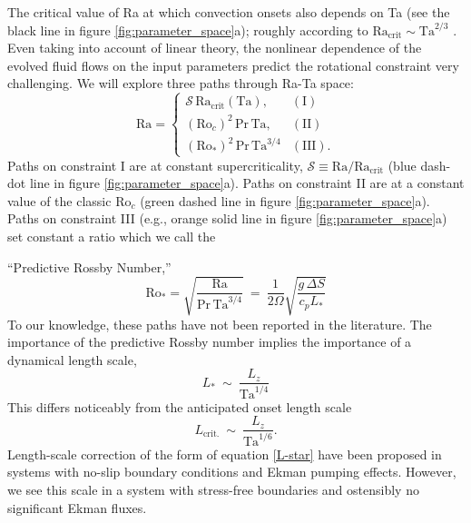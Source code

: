 \documentclass[twocolumn, amsmath, amsfonts, amssymb]{aastex62}
\newcommand{\pro}{\ensuremath{\text{Ro}_{\text{*}}}}
\newcommand{\con}{\ensuremath{\text{Ro}_{c}}}
\newcommand{\gv}[1]{{\color{blue} #1}}
\begin{document}
The critical value of Ra at which convection onsets also depends on Ta (see the black line in figure \ref{fig:parameter_space}a);  
\gv{roughly according to $\text{Ra}_{\text{crit}} \sim \text{Ta}^{2/3}$ \cite{Chandrasekhar}.}
\gv{Even taking into account of linear theory, the nonlinear dependence of the evolved fluid flows on the input parameters predict the rotational constraint very challenging. }
We will explore three paths through Ra-Ta space:
\begin{equation}
    \text{Ra} = 
    \begin{cases}
    \mathcal{S}\,\text{Ra}_\text{crit}(\text{Ta}), & (\text{I})\\
    (\con)^2 \, \text{Pr}\, \text{Ta}, & (\text{II}) \\
    (\pro)^2\, \text{Pr}\, \text{Ta}^{3/4} & (\text{III}).
    \end{cases}
    \label{eqn:paths}
\end{equation}
Paths on constraint I are at constant supercriticality, 
$\mathcal{S} \equiv \text{Ra}/\text{Ra}_{\text{crit}}$
(blue dash-dot line in figure \ref{fig:parameter_space}a).
Paths on constraint II are at a constant value of the classic $\con$ (green dashed line in figure \ref{fig:parameter_space}a). Paths on constraint
III (e.g., orange solid line in figure \ref{fig:parameter_space}a) set constant a ratio which we call the \gv{``Predictive Rossby Number,'' 
\begin{equation}
\pro = \sqrt{\frac{\text{Ra}}{\text{Pr}\,\text{Ta}^{3/4}}} \ = \    \frac{1}{2 \Omega } \sqrt{\frac{g \, \Delta  S}{c_{p} L_{*}}}
\end{equation}
To our knowledge, these paths have not been reported in the literature. The importance of the predictive Rossby number implies the importance of a dynamical length scale, 
\begin{equation}
L_{*} \ \sim \ \frac{L_{z}}{\text{Ta}^{1/4}} \label{L-star}
\end{equation}
This differs noticeably from the anticipated onset length scale 
\begin{equation}
L_{\text{crit.}} \ \sim \ \frac{L_{z}}{\text{Ta}^{1/6}}.
\end{equation}
Length-scale correction of the form of equation \ref{L-star} have been proposed in systems with no-slip boundary conditions and Ekman pumping effects. However, we see this scale in a system with stress-free boundaries and ostensibly no significant Ekman fluxes. 


}
\end{document}
